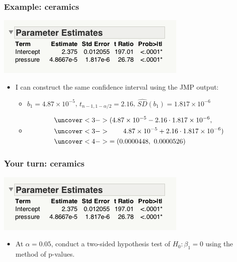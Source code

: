 \documentclass[handout]{beamer}\usepackage{graphicx, color}
\providecommand{\wh}[1]{\widehat{#1}}
\numberwithin{equation}{section}
\begin{document}
\begin{frame}
\frametitle{Example: ceramics}
\begin{center}
 \includegraphics{../../fig/jmpcerparams.png}
\end{center}
\begin{itemize}
\item I can construct the same confidence interval using the JMP output:
\begin{itemize}
\pause \item $b_1 = 4.87 \times 10^{-5}$, $t_{n - 1, 1 - \alpha/2} = 2.16$, $\wh{SD}(b_1) = 1.817 \times 10^{-6}$
\item 
\begin{align*}
&\uncover<3->{(4.87 \times 10^{-5} - 2.16 \cdot 1.817 \times 10^{-6},} \\
 &\uncover<3->{ \qquad 4.87 \times 10^{-5} + 2.16 \cdot 1.817 \times 10^{-6})} \\
&\uncover<4->{= (0.0000448, \ 0.0000526)}
\end{align*}
\end{itemize}
\end{itemize}
\end{frame}


\begin{frame}
\frametitle{Your turn: ceramics}
\begin{center}
 \includegraphics{../../fig/jmpcerparams.png}
\end{center}

\begin{itemize}
\item At $\alpha = 0.05$, conduct a two-sided hypothesis test of $H_0: \beta_1 = 0$ using the method of p-values.
\end{itemize}
\end{frame}
\end{document}

